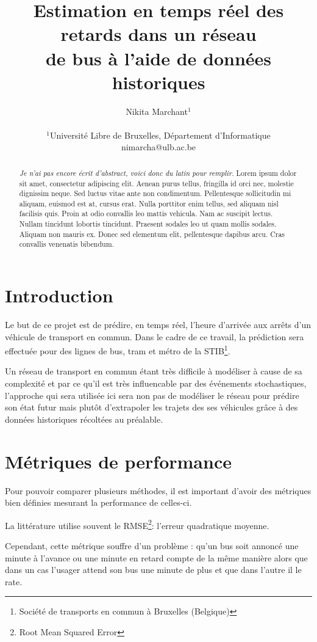 \documentclass[letterpaper]{article}
\title{Estimation en temps réel des retards dans un réseau\\ de bus à l'aide de données historiques}
\author{Nikita Marchant$^{1}$\\
\mbox{}\\
$^1$Université Libre de Bruxelles, Département d'Informatique\\
nimarcha@ulb.ac.be}
\begin{document}
\maketitle

\begin{abstract}
\textit{Je n'ai pas encore écrit d'abstract, voici donc du latin pour remplir.}
Lorem ipsum dolor sit amet, consectetur adipiscing elit.
Aenean purus tellus, fringilla id orci nec, molestie dignissim neque.
Sed luctus vitae ante non condimentum. Pellentesque sollicitudin mi aliquam, euismod est at, cursus erat.
Nulla porttitor enim tellus, sed aliquam nisl facilisis quis.
Proin at odio convallis leo mattis vehicula. Nam ac suscipit lectus.
Nullam tincidunt lobortis tincidunt. Praesent sodales leo ut quam mollis sodales.
Aliquam non mauris ex. Donec sed elementum elit, pellentesque dapibus arcu.
Cras convallis venenatis bibendum.
\end{abstract}

\section{Introduction}

Le but de ce projet est de prédire, en temps réel, l'heure d'arrivée aux arrêts d'un véhicule de transport en commun.
Dans le cadre de ce travail, la prédiction sera effectuée pour des lignes de bus,
tram et métro de la STIB\footnote{Société de transports en commun à Bruxelles (Belgique)}.

Un réseau de transport en commun étant très difficile à modéliser à cause de sa complexité et par ce qu'il est très influencable par des événements stochastiques,
l'approche qui sera utilisée ici sera non pas de modéliser le réseau pour prédire son état futur mais plutôt d'extrapoler les trajets des ses véhicules grâce à des données historiques récoltées au préalable.

\section{Métriques de performance}

Pour pouvoir comparer plusieurs méthodes,
il est important d'avoir des métriques bien définies mesurant la performance de celles-ci.

La littérature utilise souvent le RMSE\footnote{Root Mean Squared Error}: l'erreur quadratique moyenne.

Cependant, cette métrique souffre d'un problème :
qu'un bus soit annoncé une minute à l'avance ou une minute en retard compte de la même manière alors que dans un cas l'usager attend son bus une minute de plus et que dans l'autre il le rate.
\end{document}
